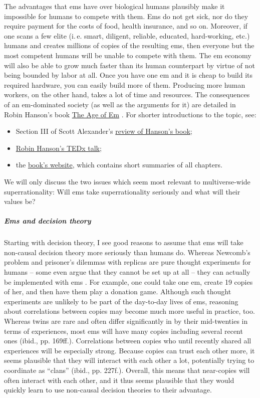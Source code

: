 \documentclass[]{article}
\let\oldsubparagraph\subparagraph
\renewcommand{\subparagraph}[1]{\oldsubparagraph{#1}\mbox{}}
\begin{document}
The advantages that ems have over biological humans plausibly make it
impossible for humans to compete with them. Ems do not get sick, nor do
they require payment for the costs of food, health insurance, and so on.
Moreover, if one scans a few elite (i.\,e. smart, diligent, reliable,
educated, hard-working, etc.) humans and creates millions of copies of
the resulting ems, then everyone but the most competent humans will be
unable to compete with them. The em economy will also be able to grow
much faster than its human counterpart by virtue of not being bounded by
labor at all. Once you have one em and it is cheap to build its required
hardware, you can easily build more of them. Producing more human
workers, on the other hand, takes a lot of time and resources. The
consequences of an em-dominated society (as well as the arguments for
it) are detailed in Robin Hanson's book 
\href{http://ageofem.com/}{The Age of Em} \citeyear{Hanson2016-yn}. For shorter
introductions to the topic, see:

\begin{itemize}
\item
  Section III of Scott Alexander's
  \href{http://slatestarcodex.com/2016/05/28/book-review-age-of-em/}{review
  of Hanson's book};
\item
  \href{https://www.youtube.com/watch?v=9qcIsjrHENU}{Robin
  Hanson's TEDx talk};
\item
  the \href{http://ageofem.com/}{book's website}, which contains
  short summaries of all chapters.
\end{itemize}

We will only discuss the two issues which seem most relevant to
multiverse-wide superrationality: Will ems take superrationality
seriously and what will their values be?

\subparagraph{Ems and decision theory}\label{ems-and-decision-theory}

Starting with decision theory, I see good reasons to assume that ems
will take non-causal decision theory more seriously than humans do.
Whereas Newcomb's problem and prisoner's dilemmas with replicas are pure
thought experiments for humans -- some even argue that they cannot be
set up at all \parencite[chapter 10]{Binmore2007-mk} -- they can actually be implemented with ems
\parencite[page 85ff]{Yudkowsky2010-xo}. For example, one could take
one em, create 19 copies of her, and then have them play a donation
game. Although such thought experiments are unlikely to be part of the
day-to-day lives of ems, reasoning about correlations between copies may
become much more useful in practice, too. Whereas twins are rare and
often differ significantly in by their mid-twenties in terms of
experiences, most ems will have many copies \parencite[p. 155]{Hanson2016-yn}
including several recent ones (ibid., pp. 169ff.). Correlations between
copies who until recently shared all experiences will be especially
strong. Because copies can trust each other more, it seems plausible
that they will interact with each other a lot, potentially trying to
coordinate as ``clans'' (ibid., pp. 227f.). Overall, this means that
near-copies will often interact with each other, and it thus seems
plausible that they would quickly learn to use non-causal decision
theories to their advantage.
\end{document}
